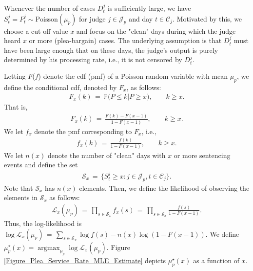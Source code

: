\documentclass[11pt, oneside]{article}   	%
\theoremstyle{ModifiedStyle}
\DeclareMathOperator*{\argmax}{argmax}
\begin{document}
			Whenever the number of cases $D^j_t$ is sufficiently large, we have $S^j_t = P^j_t \sim \text{Poisson}(\mu_p)$ for judge $j\in\mathcal{J}_p$ and day $t\in\mathcal{C}_j$. Motivated by this, we choose a cut off value $x$ and focus on the "clean" days during which the judge heard $x$ or more (plea-bargain) cases. The underlying assumption is that $D^j_t$ must have been large enough that on these days, the judge's output is purely determined by his processing rate, i.e., it is not censored by $D^j_t$.

			Letting $F$($f$)  denote the cdf (pmf) of a Poisson random variable with mean $\mu_p$, we define the conditional cdf, denoted by $F_x$, as follows:
			\begin{align*}
				F_x(k) \,=\, \mathbb{P}\big( P \leq k | P \geq x \big), \quad\quad k\geq x.
			\end{align*}
			That is,
			\begin{align*}
				F_x(k) \,=\, \frac{F(k)-F(x-1)}{1-F(x-1)}, \quad\quad k\geq x.
			\end{align*}
			We let $f_x$ denote the pmf corresponding to $F_x$, i.e.,
			\begin{align*}
				f_x(k) \,=\, \frac{f(k)}{1-F(x-1)}, \quad\quad k \geq x.
			\end{align*}
			We let $n(x)$ denote the number of "clean" days with $x$ or more sentencing events and define the set
			\begin{align*}
				\mathcal{S}_x \,=\, \{ S^j_t \geq x: j\in\mathcal{J}_p,t\in\mathcal{C}_j \}.
			\end{align*}
			Note that $\mathcal{S}_x$ has $n(x)$ elements. Then, we define the likelihood of observing the elements in $\mathcal{S}_x$ as follows:
			\begin{align*}
				\mathcal{L}_x(\mu_p) \,=\, \prod_{s\in\mathcal{S}_x} f_x(s) \,=\, \prod_{s\in\mathcal{S}_x} \frac{f(s)}{1-F(x-1)}.
			\end{align*}
			Thus, the log-likelihood is $\log \mathcal{L}_x(\mu_p) \,=\, \sum_{s\in\mathcal{S}_x} \log f(s) - n(x) \log (1-F(x-1))$. We define $\mu^\star_p(x) = \argmax_{\mu_p} \log \mathcal{L}_x(\mu_p)$. Figure \ref{Figure_Plea_Service_Rate_MLE_Estimate} depicts $\mu^\star_p(x)$ as a function of $x$.
\end{document}
